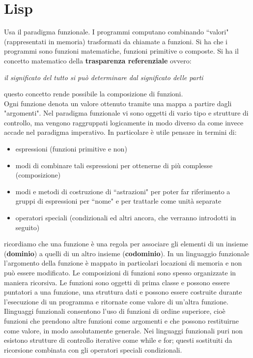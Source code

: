 \documentclass[a4paper,12pt, oneside]{book}
\begin{document}
\chapter{Lisp}
Usa il paradigma funzionale. I programmi computano combinando “valori" (rappresentati in memoria) trasformati da chiamate a funzioni. Si ha che i programmi sono funzioni matematiche, funzioni primitive o composte. Si ha il concetto matematico della \textbf{trasparenza referenziale} ovvero:
\begin{center}
\textit{il significato del tutto si può determinare dal significato delle parti}
\end{center}
questo concetto rende possibile la composizione di funzioni.\\
Ogni funzione denota un valore ottenuto tramite una mappa a
partire dagli "argomenti". Nel paradigma funzionale vi sono oggetti di vario tipo e strutture di controllo, ma vengono raggruppati logicamente in modo
diverso da come invece accade nel paradigma imperativo. In
particolare è utile pensare in termini di:
\begin{itemize}
\item espressioni (funzioni primitive e non)
\item modi di combinare tali espressioni per ottenerne di più
complesse (composizione)
\item modi e metodi di costruzione di “astrazioni" per poter far
riferimento a gruppi di espressioni per “nome" e per trattarle
come unità separate
\item operatori speciali (condizionali ed altri ancora, che verranno
introdotti in seguito)
\end{itemize}
ricordiamo che una funzione è una regola per associare gli elementi di un insieme (\textbf{dominio}) a quelli di un altro insieme (\textbf{codominio}). In un linguaggio funzionale l'argomento della funzione è mappato in particolari locazioni di memoria e non può essere modificato. Le composizioni di funzioni sono spesso organizzate in maniera ricorsiva. Le funzioni sono oggetti di prima classe e possono essere puntatori a una funzione, una struttura dati e possono essere costruite durante l’esecuzione di un programma e ritornate come valore di un’altra funzione. Ilinguaggi funzionali consentono l’uso di funzioni di ordine superiore, cioè funzioni che prendono altre funzioni come argomenti e che possono restituirne come valore, in modo assolutamente generale. Nei linguaggi funzionali puri non esistono strutture di controllo iterative come while e for; questi sostituiti da ricorsione combinata con gli operatori speciali condizionali.\\
\end{document}
